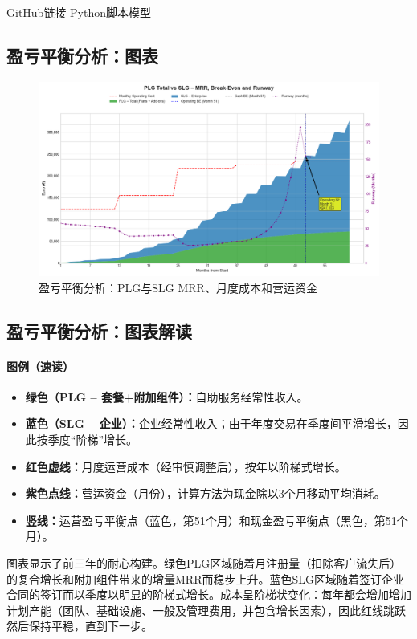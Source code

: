 \documentclass[11点, A4纸, 单面]{article}
\begin{document}
GitHub链接 \href{https://github.com/kuduk/intellyhub-businessplan/blob/main/breakeven.v2.02.py}{Python脚本模型}

\newpage
\subsection{盈亏平衡分析：图表}
\begin{figure}[H]
    \centering 
    \includegraphics[width=\textwidth]{financial_projection.png}
    \caption{盈亏平衡分析：PLG与SLG MRR、月度成本和营运资金}
    \label{fig:break_even_analysis}
\end{figure} 
\subsection{盈亏平衡分析：图表解读}

\paragraph{图例（速读）}
\begin{itemize}
  \item \textbf{绿色（PLG -- 套餐+附加组件）：}自助服务经常性收入。
  \item \textbf{蓝色（SLG -- 企业）：}企业经常性收入；由于年度交易在季度间平滑增长，因此按季度“阶梯”增长。
  \item \textbf{红色虚线：}月度运营成本（经审慎调整后），按年以阶梯式增长。
  \item \textbf{紫色点线：}营运资金（月份），计算方法为现金除以3个月移动平均消耗。
  \item \textbf{竖线：}运营盈亏平衡点（蓝色，第51个月）和现金盈亏平衡点（黑色，第51个月）。
\end{itemize}

图表显示了前三年的耐心构建。绿色PLG区域随着月注册量（扣除客户流失后）的复合增长和附加组件带来的增量MRR而稳步上升。蓝色SLG区域随着签订企业合同的签订而以季度以明显的阶梯式增长。成本呈阶梯状变化：每年都会增加增加计划产能（团队、基础设施、一般及管理费用，并包含增长因素），因此红线跳跃然后保持平稳，直到下一步。
\end{document}
